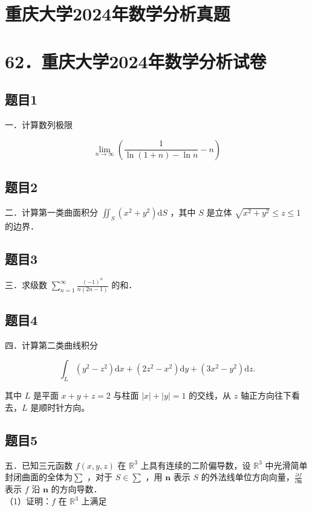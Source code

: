 \documentclass{article}
\begin{document}
\section*{重庆大学2024年数学分析真题}
\section*{62．重庆大学2024年数学分析试卷}

\subsection{题目1}
一．计算数列极限

\[
\lim _{n \rightarrow \infty}\left(\frac{1}{\ln (1+n)-\ln n}-n\right)
\]

\subsection{题目2}
二．计算第一类曲面积分 \(\iint_{S}\left(x^{2}+y^{2}\right) \mathrm{d} S\) ，其中 \(S\) 是立体 \(\sqrt{x^{2}+y^{2}} \leq z \leq 1\) 的边界．

\subsection{题目3}
三．求级数 \(\sum_{n=1}^{\infty} \frac{(-1)^{n}}{n(2 n-1)}\) 的和．

\subsection{题目4}
四．计算第二类曲线积分

\[
\int_{L}\left(y^{2}-z^{2}\right) \mathrm{d} x+\left(2 z^{2}-x^{2}\right) \mathrm{d} y+\left(3 x^{2}-y^{2}\right) \mathrm{d} z .
\]

其中 \(L\) 是平面 \(x+y+z=2\) 与柱面 \(|x|+|y|=1\) 的交线，从 \(z\) 轴正方向往下看去，\(L\) 是顺时针方向。

\subsection{题目5}
五．已知三元函数 \(f(x, y, z)\) 在 \(\mathbb{R}^{3}\) 上具有连续的二阶偏导数，设 \(\mathbb{R}^{3}\) 中光滑简单封闭曲面的全体为\(\sum\) ，对于 \(S \in \sum\) ，用 \(\mathbf{n}\) 表示 \(S\) 的外法线单位方向向量，\(\frac{\partial f}{\partial \mathbf{n}}\) 表示 \(f\) 沿 \(\mathbf{n}\) 的方向导数．\\
（1）证明：\(f\) 在 \(\mathbb{R}^{3}\) 上满足
\end{document}
